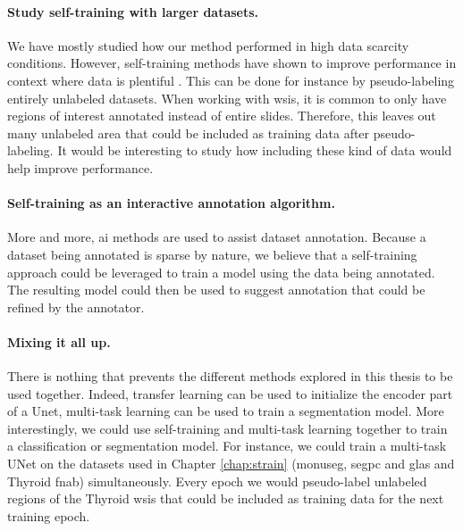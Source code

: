 \paragraph{Study self-training with larger datasets.} We have mostly studied how our method performed in high data scarcity conditions. However, self-training methods have shown to improve performance in context where data is plentiful . This can be done for instance by pseudo-labeling entirely unlabeled datasets. When working with \acrshort{wsi}s, it is common to only have regions of interest annotated instead of entire slides. Therefore, this leaves out many unlabeled area that could be included as training data after pseudo-labeling. It would be interesting to study how including these kind of data would help improve performance. 

\paragraph{Self-training as an interactive annotation algorithm.} More and more, \acrlong{ai} methods are used to assist dataset annotation. Because a dataset being annotated is sparse by nature, we believe that a self-training approach could be leveraged to train a model using the data being annotated. The resulting model could then be used to suggest annotation that could be refined by the annotator.   

\paragraph{Mixing it all up.} There is nothing that prevents the different methods explored in this thesis to be used together. Indeed, transfer learning can be used to initialize the encoder part of a Unet, multi-task learning can be used to train a segmentation model. More interestingly, we could use self-training and multi-task learning together to train a classification or segmentation model. For instance, we could train a multi-task UNet on the datasets used in Chapter \ref{chap:strain} (\acrshort{monuseg}, \acrshort{segpc} and \acrshort{glas} and Thyroid \acrshort{fnab}) simultaneously. Every epoch we would pseudo-label unlabeled regions of the Thyroid \acrlong{wsi}s that could be included as training data for the next training epoch.






